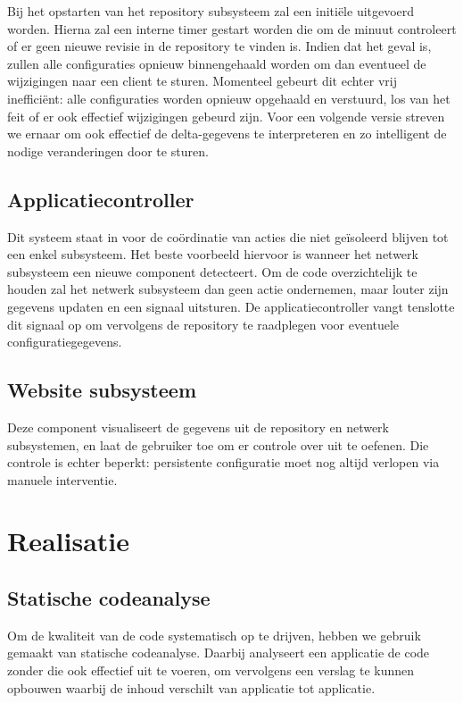 Bij het opstarten van het repository subsysteem zal een initiële  uitgevoerd worden. Hierna zal een interne timer gestart worden die om de minuut controleert of er geen nieuwe revisie in de repository te vinden is. Indien dat het geval is, zullen alle configuraties opnieuw binnengehaald worden om dan eventueel de wijzigingen naar een client te sturen. Momenteel gebeurt dit echter vrij inefficiënt: alle configuraties worden opnieuw opgehaald en verstuurd, los van het feit of er ook effectief wijzigingen gebeurd zijn. Voor een volgende versie streven we ernaar om ook effectief de delta-gegevens te interpreteren en zo intelligent de nodige veranderingen door te sturen.

\section{Applicatiecontroller}
\label{server:structuur:controller}

Dit systeem staat in voor de coördinatie van acties die niet geïsoleerd blijven tot een enkel subsysteem. Het beste voorbeeld hiervoor is wanneer het netwerk subsysteem een nieuwe component detecteert. Om de code overzichtelijk te houden zal het netwerk subsysteem dan geen actie ondernemen, maar louter zijn gegevens updaten en een signaal uitsturen. De applicatiecontroller vangt tenslotte dit signaal op om vervolgens de repository te raadplegen voor eventuele configuratiegegevens.

\section{Website subsysteem}
\label{server:structuur:website}

Deze component visualiseert de gegevens uit de repository en netwerk subsystemen, en laat de gebruiker toe om er controle over uit te oefenen. Die controle is echter beperkt: persistente configuratie moet nog altijd verlopen via manuele interventie.

\chapter{Realisatie}
\label{server:realisatie}

\section{Statische codeanalyse}
\label{server:realisatie:codeanalyse}

Om de kwaliteit van de code systematisch op te drijven, hebben we gebruik gemaakt van statische codeanalyse. Daarbij analyseert een applicatie de code zonder die ook effectief uit te voeren, om vervolgens een verslag te kunnen opbouwen waarbij de inhoud verschilt van applicatie tot applicatie.

